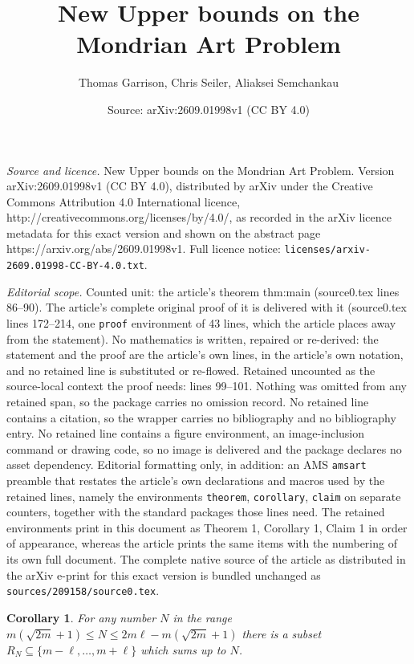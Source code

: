 \documentclass[10pt,a4paper]{amsart}
\title{New Upper bounds on the Mondrian Art Problem}
\author{Thomas Garrison, Chris Seiler, Aliaksei Semchankau}
\date{Source: arXiv:2609.01998v1 (CC BY 4.0)}
\newtheorem{corollary}{Corollary}
\begin{document}
\maketitle

\noindent\emph{Source and licence.} New Upper bounds on the Mondrian Art Problem. Version arXiv:2609.01998v1 (CC BY 4.0), distributed by arXiv under the Creative Commons Attribution 4.0 International licence, http://creativecommons.org/licenses/by/4.0/, as recorded in the arXiv licence metadata for this exact version and shown on the abstract page https://arxiv.org/abs/2609.01998v1. Full licence notice: \texttt{licenses/arxiv-2609.01998-CC-BY-4.0.txt}.\par\smallskip

\noindent\textit{Editorial scope.} Counted unit: the article's theorem thm:main (source0.tex lines 86--90). The article's complete original proof of it is delivered with it (source0.tex lines 172--214, one \texttt{proof} environment of 43 lines, which the article places away from the statement). No mathematics is written, repaired or re-derived: the statement and the proof are the article's own lines, in the article's own notation, and no retained line is substituted or re-flowed.  Retained uncounted as the source-local context the proof needs: lines 99--101.  Nothing was omitted from any retained span, so the package carries no omission record.  No retained line contains a citation, so the wrapper carries no bibliography and no bibliography entry.  No retained line contains a figure environment, an image-inclusion command or drawing code, so no image is delivered and the package declares no asset dependency.  Editorial formatting only, in addition: an AMS \texttt{amsart} preamble that restates the article's own declarations and macros used by the retained lines, namely the environments \texttt{theorem}, \texttt{corollary}, \texttt{claim} on separate counters, together with the standard packages those lines need.  The retained environments print in this document as Theorem 1, Corollary 1, Claim 1 in order of appearance, whereas the article prints the same items with the numbering of its own full document.  The complete native source of the article as distributed in the arXiv e-print for this exact version is bundled unchanged as \texttt{sources/209158/source0.tex}.
\begin{corollary}\label{cor:range}
 For any number $N$ in the range $m(\sqrt{2m}+1) \leq N \leq 2m\ell - m(\sqrt{2m}+1)$ there is a subset $R_N \subseteq \{m - \ell, \ldots, m + \ell\}$ which sums up to $N$.    
\end{corollary}
\end{document}
